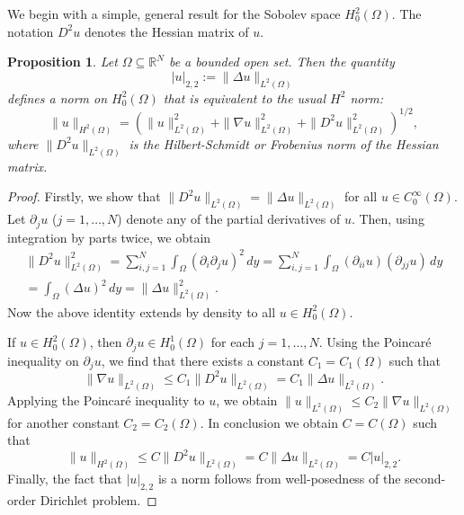 \documentclass[a4paper, reqno]{amsart}
\numberwithin{equation}{section}
\theoremstyle{plain}
\newtheorem{proposition}[theorem]{Proposition}
\theoremstyle{definition}
\theoremstyle{remark}
\newcommand{\RR}{\mathbb{R}}
\begin{document}
We begin with a simple, general result for the Sobolev space $H^2_0(\Omega)$. The notation $D^2 u$ denotes the Hessian matrix of $u$.
\begin{proposition}
  \label{prop:H22-norm}
  Let $\Omega \subseteq \RR^N$ be a bounded open set. Then the quantity
  \begin{equation*}
    |u|_{2,2} := \|\Delta u\|_{L^2(\Omega)}
  \end{equation*}
  defines a norm on $H^2_0(\Omega)$ that is equivalent to the usual $H^2$ norm:
  \begin{equation*}
    \|u\|_{H^2(\Omega)} = \left(\|u\|^2_{L^2(\Omega)} + \|\nabla u\|^2_{L^2(\Omega)} + \|D^2 u\|^2_{L^2(\Omega)} \right)^{1/2},
  \end{equation*}
  where $\|D^2u\|_{L^2(\Omega)}$ is the Hilbert-Schmidt or Frobenius norm of the Hessian matrix.
\end{proposition}

\begin{proof}
  Firstly, we show that $\|D^2 u\|_{L^2(\Omega)} = \| \Delta u \|_{L^2(\Omega)}$ for all $u \in C^\infty_0(\Omega)$. Let $\partial_j u$ ($j=1, \ldots, N$) denote any of the partial derivatives of $u$. Then, using integration by parts twice, we obtain
  \begin{multline*}
    \|D^2 u \|^2_{L^2(\Omega)} = \sum_{i,j = 1}^N \int_\Omega (\partial_i \partial_j u)^2 \,dy
    = \sum_{i,j = 1}^N \int_\Omega (\partial_{ii} u)(\partial_{jj}u) \,dy \\
    = \int_\Omega (\Delta u)^2 \,dy = \|\Delta u\|^2_{L^2(\Omega)}.
  \end{multline*}
  Now the above identity extends by density to all $u \in H^2_0(\Omega)$.

  If $u \in H^2_0(\Omega)$, then $\partial_j u \in H^1_0(\Omega)$ for each $j=1, \ldots, N$. Using the Poincar\'{e} inequality on $\partial_j u$, we find that there exists a constant $C_1 = C_1(\Omega)$ such that
  \begin{equation*}
    \| \nabla u \|_{L^2(\Omega)} \leq C_1 \| D^2 u \|_{L^2(\Omega)} = C_1 \| \Delta u \|_{L^2(\Omega)}.
  \end{equation*}
  Applying the Poincar\'{e} inequality to $u$, we obtain $\|u\|_{L^2(\Omega)} \leq C_2 \|\nabla u\|_{L^2(\Omega)}$ for another constant $C_2 = C_2(\Omega)$. In conclusion we obtain $C = C(\Omega)$ such that
  \begin{equation*}
    \|u\|_{H^2(\Omega)} \leq C \|D^2 u\|_{L^2(\Omega)} = C \|\Delta u\|_{L^2(\Omega)} = C|u|_{2,2}.
  \end{equation*}
  Finally, the fact that $|u|_{2,2}$ is a norm follows from well-posedness of the second-order Dirichlet problem.
\end{proof}
\end{document}
